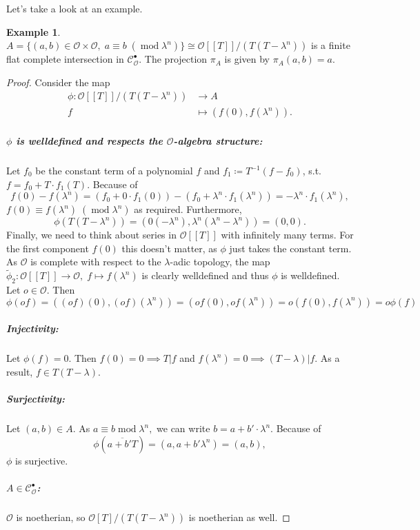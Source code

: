 \documentclass{article}
\theoremstyle{plain}%
\theoremstyle{definition}
\newtheorem{example}{Example}[section]
\theoremstyle{remark}
\newcommand{\cob}{\mathcal{C}_\mathcal{O}^\bullet}
\begin{document}
    Let's take a look at an example.
    \begin{example}\label{ex:first_1}
        \(A = \{(a,b) \in \mathcal{O}\times\mathcal{O},\; a \equiv b\; (\operatorname{mod} \lambda^n)\} 
        \cong \mathcal{O}[[T]]/(T(T-\lambda^n))\) is a finite flat complete intersection in \(\cob\).
        The projection \(\pi_A\) is given by \(\pi_A(a,b) = a\).
        \begin{proof}
            Consider the map
            \begin{align*}
                \phi\colon \mathcal{O}[[T]]/(T(T-\lambda^n)) &\to A\\
                f &\mapsto (f(0), f(\lambda^n)).
            \end{align*}
            \subparagraph*{\(\phi\) is welldefined and respects the \(\mathcal{O}\)-algebra structure:}
            Let \(f_0\) be the constant term of a polynomial \(f\) and \(f_1 \coloneqq T^{-1}(f-f_0)\), s.t. \(f = f_0 + T\cdot f_1(T)\).
            Because of
            \[f(0) - f(\lambda^n) = (f_0 + 0\cdot f_1(0)) - (f_0 + \lambda^n \cdot f_1(\lambda^n)) = -\lambda^n \cdot f_1(\lambda^n),\]
            \(f(0) \equiv f(\lambda^n)\; (\operatorname{mod} \lambda^n)\) as required.
            Furthermore, \[\phi(T(T-\lambda^n)) = (0(-\lambda^n), \lambda^n(\lambda^n - \lambda^n)) = (0,0).\]
            Finally, we need to think about series in \(\mathcal{O}[[T]]\) with infinitely many terms.
            For the first component \(f(0)\) this doesn't matter, as \(\phi\) just takes the constant term. 
            As \(\mathcal{O}\) is complete with respect to the \(\lambda\)-adic topology, 
            the map \(\tilde\phi_2\colon \mathcal{O}[[T]] \to \mathcal{O},\; f \mapsto f(\lambda^n)\) is clearly welldefined and thus \(\phi\)
            is welldefined.
            Let \(o \in \mathcal{O}\). Then 
            \[\phi(of) = ((of)(0),(of)(\lambda^n)) = (of(0), of(\lambda^n)) = o(f(0), f(\lambda^n)) = o\phi(f)\]
            \subparagraph*{Injectivity:}
            Let \(\phi(f) = 0\). Then \(f(0) = 0 \implies T | f\) and \(f(\lambda^n) = 0 \implies (T - \lambda) | f\).
            As a result, \(f \in T(T-\lambda)\).
            \subparagraph{Surjectivity:}
            Let \((a,b) \in A\).
            As \(a \equiv b \operatorname{mod} \lambda^n,\) we can write \(b = a + b' \cdot \lambda^n\). Because of
            \[\phi(\overline{a + b'T}) = (a, a + b' \lambda^n) = (a,b),\] \(\phi\) is surjective.
            \subparagraph*{\(A\in \cob\):}
            \(\mathcal{O}\) is noetherian, so \(\mathcal{O}[T]/(T(T-\lambda^n))\) is noetherian as well.

\end{proof}
\end{example}
\end{document}
